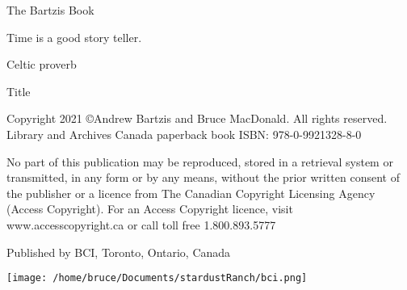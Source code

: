 \documentclass[letterpaper,9pt,twoside,titlepage,onecolumn,openany]{book}
\begin{document}
\newpage{}
\thispagestyle{empty}

\vspace{30mm}

\begin{center}
\huge{The Bartzis Book}\\
\large{}
\end{center}

\vspace{10mm}


\newpage




\begin{center}


\end{center}

\vspace{5mm}
\begin{center}

Time is a good story teller.


Celtic proverb

\end{center}

\newpage
\thispagestyle{empty}



\begin{center}



\large{Title}

\end{center}




\vspace{5mm}
\noindent
Copyright 2021  \copyright Andrew Bartzis and Bruce MacDonald. All rights reserved.
Library and Archives Canada paperback book ISBN: 978-0-9921328-8-0


\vspace{5mm}
\noindent
No part of this publication may be reproduced, stored in a retrieval system or transmitted, in any form or by any means, without the prior written consent of the publisher or a licence from The Canadian Copyright Licensing Agency (Access Copyright). For an Access Copyright licence, visit www.accesscopyright.ca or call toll free 1.800.893.5777


\vspace{5mm}
\noindent
Published by BCI, Toronto, Ontario, Canada


\begin{center}


\texttt{[image: /home/bruce/Documents/stardustRanch/bci.png]}

\end{center}
\end{document}

